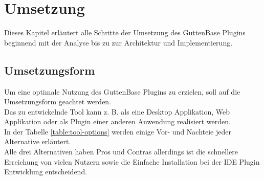 \chapter{Umsetzung}
Dieses Kapitel erläutert alle Schritte der Umsetzung des GuttenBase Plugins beginnend mit der Analyse bis zu zur Architektur und Implementierung.

\section{Umsetzungsform}
Um eine optimale Nutzung des GuttenBase Plugins zu erzielen, soll auf die Umsetzungsform geachtet werden.\\
Das zu entwickelnde Tool kann z. B. als eine Desktop Applikation, Web Applikation oder als Plugin einer anderen Anwendung realisiert werden.\\
In der Tabelle \ref{table:tool-options} werden einige Vor- und Nachteie jeder Alternative erläutert. \\
Alle drei Alternativen haben Pros und Contras allerdings ist die schnellere Erreichung von vielen Nutzern sowie die Einfache Installation bei der IDE Plugin Entwicklung entscheidend. 
